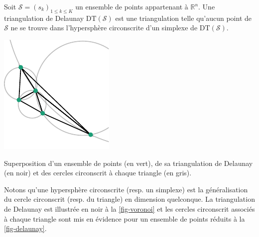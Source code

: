        \begin{mydef}
            Soit $\mathcal{S}=(s_k)_{1\leq k\leq K}$ un ensemble de points appartenant à $\mathbb{R}^n$. Une triangulation de Delaunay $\mathrm{DT}(\mathcal{S})$ est une triangulation telle qu'aucun point de $\mathcal{S}$ ne se trouve dans l'hypersphère circonscrite d'un simplexe de $\mathrm{DT}(\mathcal{S})$.
        \end{mydef}
    \begin{marginfigure}
        \centering
        \includegraphics[]{img/chapitre2/figure3/Delaunay.pdf}
        \caption{Superposition d'un ensemble de points (en vert), de sa triangulation de Delaunay (en noir) et des cercles circonscrit à chaque triangle (en gris).}
        \label{fig-delaunay}
    \end{marginfigure}
        Notons qu'une hypersphère circonscrite (resp. un simplexe) est la généralisation du cercle circonscrit (resp. du triangle) en dimension quelconque. La triangulation de Delaunay est illustrée en noir à la \cref{fig-voronoi} et les cercles circonscrit associés à chaque triangle sont mis en évidence pour un ensemble de points réduits à la \cref{fig-delaunay}.